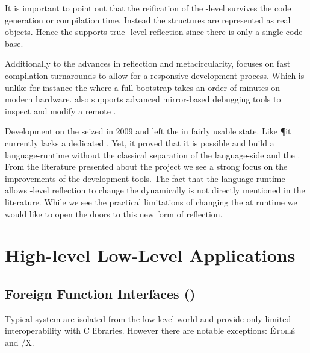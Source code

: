 It is important to point out that the reification of the \VM-level survives the code generation or compilation time.
Instead the \VM structures are represented as real \Self objects.
Hence the \Klein \VM supports true \VM-level reflection since there is only a single code base.

Additionally to the advances in reflection and metacircularity, \Klein focuses on fast compilation turnarounds to allow for a responsive development process.
Which is unlike for instance the \Squeak \VM where a full \VM bootstrap takes an order of minutes on modern hardware.
\Klein also supports advanced mirror-based debugging tools to inspect and modify a remote \VM.

Development on the \Klein \VM seized in 2009 and left the \Klein \VM in fairly usable state.
Like \P it currently lacks a dedicated \GC.
Yet, it proved that it is possible and build a language-runtime without the classical separation of the language-side and the \VM.
From the literature presented about the \Klein project we see a strong focus on the improvements of the development tools.
The fact that the language-runtime allows \VM-level reflection to change the \VM dynamically is not directly mentioned in the literature.
While we see the practical limitations of changing the \VM at runtime we would like to open the doors to this new form of reflection.


\section{High-level Low-Level Applications}

\subsection{Foreign Function Interfaces (\FFI)}

Typical \ST system are isolated from the low-level world and provide only limited interoperability with C libraries.
However there are notable exceptions: \textsc{Étoilé} and \ST/X.

